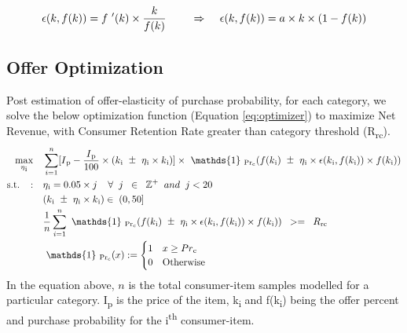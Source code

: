  \begin{equation}
    \epsilon(k,f(k)) = f\textsuperscript{'}(k) \times\frac{k}{f(k)} \;\;\;\; \;\;\;\;
    \Rightarrow \;\;\;\;\epsilon(k,f(k)) = a\times k\times (1 - f(k))
    \label{eq:offerelasticity}
  \end{equation}

\subsection{Offer Optimization}
Post estimation of offer-elasticity of purchase probability, for each category, we solve the
below optimization function (Equation \ref{eq:optimizer}) to maximize Net Revenue,
with Consumer Retention Rate greater than category threshold (R\textsubscript{rc}).
\begin{equation}
\begin{aligned}
\max_{\eta\textsubscript{i}} \quad & 
\sum_{i=1}^{n} [I\textsubscript{p} - \frac{I\textsubscript{p}}{100} \times 
    (k\textsubscript{i} \mypm \eta\textsubscript{i}\times k\textsubscript{i})]
    \times
    \ \mathds{1} \ \textsubscript{Pr\textsubscript{c}}(f(k\textsubscript{i}) \mypm \eta\textsubscript{i}\times 
    \epsilon(k\textsubscript{i},f(k\textsubscript{i}))\times f(k\textsubscript{i})) \\
\textrm{s.t.} \;\;\;: \quad & \eta\textsubscript{i} = 0.05\times j \;\;\;\;  
\forall \;\;  j \;\; \in \;\; \mathbb{Z}^+  \;\;and\;\; j<20 \\
& (k\textsubscript{i} \mypm \eta\textsubscript{i}\times k\textsubscript{i}) \in \; (0,50]\\
& \frac{1}{n} \sum_{i=1}^{n} \ \mathds{1} \ \textsubscript{Pr\textsubscript{c}}(f(k\textsubscript{i}) \mypm 
    \eta\textsubscript{i}\times 
    \epsilon(k\textsubscript{i},f(k\textsubscript{i}))\times f(k\textsubscript{i})) \;\; >= \;\; R\textsubscript{rc} \\
&\ \mathds{1} \ \textsubscript{Pr\textsubscript{c}}(x) :=
        \begin{cases}
          1 & x \geq Pr\textsubscript{c}\\
          0 & \text{Otherwise}
        \end{cases}
\end{aligned}
\label{eq:optimizer}
\end{equation}
In the equation above, $n$ is the total consumer-item samples modelled for a particular category.
I\textsubscript{p} is the price of the item, k\textsubscript{i} and f(k\textsubscript{i}) 
being the offer percent and purchase probability for the i\textsuperscript{th} consumer-item.
